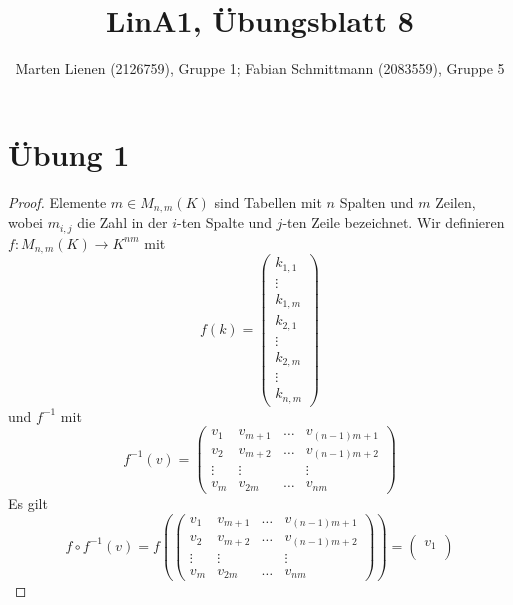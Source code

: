 \documentclass[a4paper,10pt]{article}
\title{LinA1, Übungsblatt 8}
\author{Marten Lienen (2126759), Gruppe 1; Fabian Schmittmann (2083559), Gruppe 5}
\begin{document}
\maketitle

\section*{Übung 1}

\begin{proof}
 Elemente $m \in M_{n,m}(K)$ sind Tabellen mit $n$ Spalten und $m$ Zeilen, wobei $m_{i,j}$ die Zahl in der $i$-ten Spalte und $j$-ten Zeile bezeichnet.
 Wir definieren $f: M_{n,m}(K) \rightarrow K^{nm}$ mit
 \begin{equation}
  f(k) = \begin{pmatrix}
          k_{1,1}\\
          \vdots\\
          k_{1,m}\\
          k_{2,1}\\
          \vdots\\
          k_{2,m}\\
          \vdots\\
          k_{n,m}
         \end{pmatrix}
 \end{equation}
 und $f^{-1}$ mit
 \begin{equation}
  f^{-1}(v) = \begin{pmatrix}
               v_1 & v_{m + 1} & \dots & v_{(n - 1)m + 1}\\
               v_2 & v_{m + 2} & \dots & v_{(n - 1)m + 2}\\
               \vdots & \vdots & & \vdots\\
               v_m & v_{2m} & \dots & v_{nm}
              \end{pmatrix}
 \end{equation}
 Es gilt
 \begin{equation}
  f \circ f^{-1}(v) = f(\begin{pmatrix}
               v_1 & v_{m + 1} & \dots & v_{(n - 1)m + 1}\\
               v_2 & v_{m + 2} & \dots & v_{(n - 1)m + 2}\\
               \vdots & \vdots & & \vdots\\
               v_m & v_{2m} & \dots & v_{nm}
              \end{pmatrix})
              = \begin{pmatrix}
                 v_1\\

\end{pmatrix}
\end{equation}
\end{proof}
\end{document}
